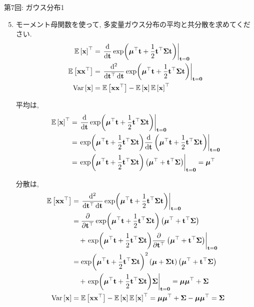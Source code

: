 \documentclass[dvipdfmx,notheorems,t]{beamer}
\begin{document}
\begin{frame}{第7回: ガウス分布1}
\begin{enumerate}
  \setcounter{enumi}{4}
  \item モーメント母関数を使って, 多変量ガウス分布の平均と共分散を求めてください.
  \begin{align*}
    \operatorname{\mathbb{E}} \left[ \vb{x} \right]^\top
    &= \left. \dv{\vb{t}} \exp(\vb*{\mu}^\top \vb{t} + \frac{1}{2} \vb{t}^\top \vb{\Sigma} \vb{t})
      \right|_{\vb{t} = \vb{0}} \\
    \operatorname{\mathbb{E}} \left[ \vb{x} \vb{x}^\top \right]
    &= \left. \frac{\dd[2]}{\dd{\vb{t}^\top} \dd{\vb{t}}}
      \exp(\vb*{\mu}^\top \vb{t} + \frac{1}{2} \vb{t}^\top \vb{\Sigma} \vb{t})
      \right|_{\vb{t} = \vb{0}} \\
    \operatorname{Var} \left[ \vb{x} \right] &= \operatorname{\mathbb{E}} \left[ \vb{x} \vb{x}^\top \right] - \operatorname{\mathbb{E}} \left[ \vb{x} \right] \operatorname{\mathbb{E}} \left[ \vb{x} \right]^\top
  \end{align*}

  \newpage
  平均は,
  \begin{align*}
    \operatorname{\mathbb{E}} \left[ \vb{x} \right]^\top
    &= \left. \dv{\vb{t}} \exp(\vb*{\mu}^\top \vb{t} + \frac{1}{2} \vb{t}^\top \vb{\Sigma} \vb{t})
      \right|_{\vb{t} = \vb{0}} \\
    &= \left. \exp(\vb*{\mu}^\top \vb{t} + \frac{1}{2} \vb{t}^\top \vb{\Sigma} \vb{t})
      \dv{\vb{t}} \left( \vb*{\mu}^\top \vb{t} + \frac{1}{2} \vb{t}^\top \vb{\Sigma} \vb{t} \right)
      \right|_{\vb{t} = \vb{0}} \\
    &= \left. \exp(\vb*{\mu}^\top \vb{t} + \frac{1}{2} \vb{t}^\top \vb{\Sigma} \vb{t})
      \left( \vb*{\mu}^\top + \vb{t}^\top \vb{\Sigma} \right)
      \right|_{\vb{t} = \vb{0}} = \vb*{\mu}^\top
  \end{align*}

  \newpage
  分散は,
  \begin{align*}
    \operatorname{\mathbb{E}} \left[ \vb{x} \vb{x}^\top \right]
    &= \left. \frac{\dd[2]}{\dd{\vb{t}^\top} \dd{\vb{t}}}
      \exp(\vb*{\mu}^\top \vb{t} + \frac{1}{2} \vb{t}^\top \vb{\Sigma} \vb{t})
      \right|_{\vb{t} = \vb{0}} \\
    &= \pdv{\vb{t}^\top} \exp(\vb*{\mu}^\top \vb{t} + \frac{1}{2} \vb{t}^\top \vb{\Sigma} \vb{t})
      \left( \vb*{\mu}^\top + \vb{t}^\top \vb{\Sigma} \right) \\
    & \quad + \left. \exp(\vb*{\mu}^\top \vb{t} + \frac{1}{2} \vb{t}^\top \vb{\Sigma} \vb{t})
      \pdv{\vb{t}^\top} \left( \vb*{\mu}^\top + \vb{t}^\top \vb{\Sigma} \right)
      \right|_{\vb{t} = \vb{0}} \\
    &= \exp(\vb*{\mu}^\top \vb{t} + \frac{1}{2} \vb{t}^\top \vb{\Sigma} \vb{t})^2
      \left( \vb*{\mu} + \vb{\Sigma} \vb{t} \right)
      \left( \vb*{\mu}^\top + \vb{t}^\top \vb{\Sigma} \right) \\
    & \quad + \left. \exp(\vb*{\mu}^\top \vb{t} + \frac{1}{2} \vb{t}^\top \vb{\Sigma} \vb{t})
      \vb{\Sigma} \right|_{\vb{t} = \vb{0}}
    = \vb*{\mu} \vb*{\mu}^\top + \vb{\Sigma} \\
    \operatorname{Var} \left[ \vb{x} \right] &= \operatorname{\mathbb{E}} \left[ \vb{x} \vb{x}^\top \right] - \operatorname{\mathbb{E}} \left[ \vb{x} \right] \operatorname{\mathbb{E}} \left[ \vb{x} \right]^\top
    = \vb*{\mu} \vb*{\mu}^\top + \vb{\Sigma} - \vb*{\mu} \vb*{\mu}^\top = \vb{\Sigma}
  \end{align*}
\end{enumerate}
\end{frame}
\end{document}
